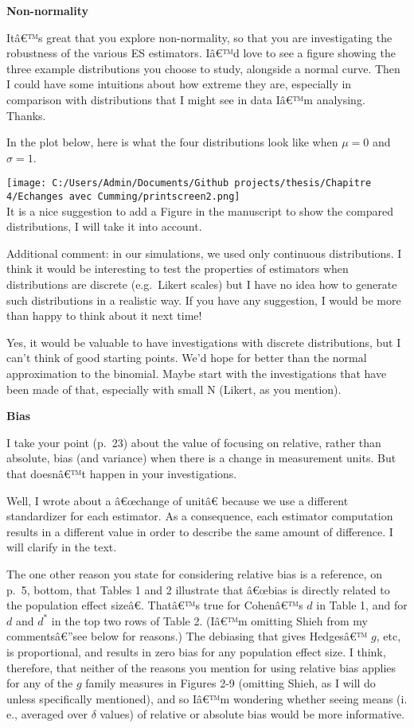 \begin{appendix}
\color{black} \textbf{Non-normality}

Itâ€™s great that you explore non-normality, so that you are
investigating the robustness of the various ES estimators. Iâ€™d love to
see a figure showing the three example distributions you choose to
study, alongside a normal curve. Then I could have some intuitions about
how extreme they are, especially in comparison with distributions that I
might see in data Iâ€™m analysing. Thanks.

\color{blue} In the plot below, here is what the four distributions look
like when \(\mu = 0\) and \(\sigma = 1\).

\texttt{[image: C:/Users/Admin/Documents/Github projects/thesis/Chapitre 4/Echanges avec Cumming/printscreen2.png]}\\
It is a nice suggestion to add a Figure in the manuscript to show the
compared distributions, I will take it into account.

Additional comment: in our simulations, we used only continuous
distributions. I think it would be interesting to test the properties of
estimators when distributions are discrete (e.g.~Likert scales) but I
have no idea how to generate such distributions in a realistic way. If
you have any suggestion, I would be more than happy to think about it
next time!

\color{brown} Yes, it would be valuable to have investigations with
discrete distributions, but I can't think of good starting points. We'd
hope for better than the normal approximation to the binomial. Maybe
start with the investigations that have been made of that, especially
with small N (Likert, as you mention).

\color{black}\textbf{Bias}

I take your point (p.~23) about the value of focusing on relative,
rather than absolute, bias (and variance) when there is a change in
measurement units. But that doesnâ€™t happen in your investigations.

\color{blue} Well, I wrote about a â€œchange of unitâ€ because we use a
different standardizer for each estimator. As a consequence, each
estimator computation results in a different value in order to describe
the same amount of difference. I will clarify in the text.

\color{black} The one other reason you state for considering relative
bias is a reference, on p.~5, bottom, that Tables 1 and 2 illustrate
that â€œbias is directly related to the population effect sizeâ€.
Thatâ€™s true for Cohenâ€™s \(d\) in Table 1, and for \(d\) and \(d^*\)
in the top two rows of Table 2. (Iâ€™m omitting Shieh from my
commentsâ€''see below for reasons.) The debiasing that gives Hedgesâ€™
\(g\), etc, is proportional, and results in zero bias for any population
effect size. I think, therefore, that neither of the reasons you mention
for using relative bias applies for any of the \(g\) family measures in
Figures 2-9 (omitting Shieh, as I will do unless specifically
mentioned), and so Iâ€™m wondering whether seeing means (i. e., averaged
over \(\delta\) values) of relative or absolute bias would be more
informative.


\end{appendix}
